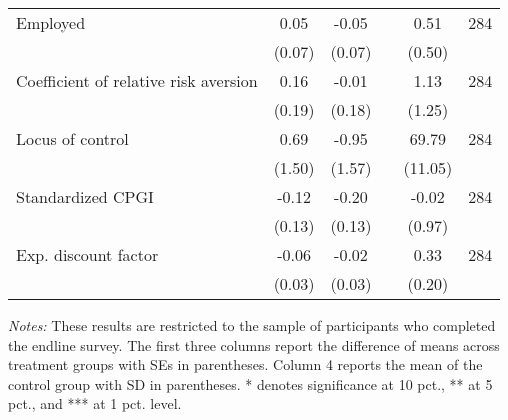 \begin{table}[h]
{\begin{threeparttable}
\begin{tabular}{l*{5}{c}}
Employed  &     0.05&    -0.05&         &     0.51&      284\\
          &   (0.07)&   (0.07)&         &   (0.50)&         \\
Coefficient of relative risk aversion&     0.16&    -0.01&         &     1.13&      284\\
          &   (0.19)&   (0.18)&         &   (1.25)&         \\
Locus of control&     0.69&    -0.95&         &    69.79&      284\\
          &   (1.50)&   (1.57)&         &  (11.05)&         \\
Standardized CPGI&    -0.12&    -0.20&         &    -0.02&      284\\
          &   (0.13)&   (0.13)&         &   (0.97)&         \\
Exp. discount factor&-0.06\sym{*}&    -0.02&         &     0.33&      284\\
          &   (0.03)&   (0.03)&         &   (0.20)&         \\
\bottomrule \end{tabular} \begin{tablenotes}[flushleft] \footnotesize \item \emph{Notes:} These results are restricted to the sample of participants who completed the endline survey. The first three columns report the difference of means across treatment groups with SEs in parentheses. Column 4 reports the mean of the control group with SD in parentheses. * denotes significance at 10 pct., ** at 5 pct., and *** at 1 pct. level. \end{tablenotes} \end{threeparttable} } \end{table}


